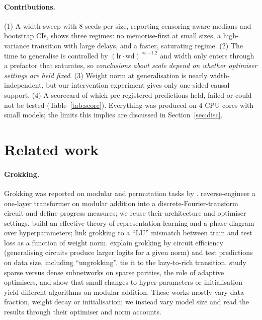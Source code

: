 \documentclass{article} %
\begin{document}
\paragraph{Contributions.} (1) A width sweep with 8 seeds per size, reporting censoring-aware medians and bootstrap CIs, shows three regimes: no memorise-first at small sizes, a high-variance transition with large delays, and a faster, saturating regime. (2) The time to generalise is controlled by $(\mathrm{lr}\cdot\mathrm{wd})^{\approx-1.2}$ and width only enters through a prefactor that saturates, so \emph{conclusions about scale depend on whether optimiser settings are held fixed}. (3) Weight norm at generalisation is nearly width-independent, but our intervention experiment gives only one-sided causal support. (4) A scorecard of which pre-registered predictions held, failed or could not be tested (Table~\ref{tab:score}). Everything was produced on 4 CPU cores with small models; the limits this implies are discussed in Section~\ref{sec:disc}.

\section{Related work}
\paragraph{Grokking.} Grokking was reported on modular and permutation tasks by \citet{power2022grokking}. \citet{nanda2023progress} reverse-engineer a one-layer transformer on modular addition into a discrete-Fourier-transform circuit and define progress measures; we reuse their architecture and optimiser settings. \citet{liu2022understanding} build an effective theory of representation learning and a phase diagram over hyperparameters; \citet{liu2023omnigrok} link grokking to a ``LU'' mismatch between train and test loss as a function of weight norm. \citet{varma2023explaining} explain grokking by circuit efficiency (generalising circuits produce larger logits for a given norm) and test predictions on data size, including ``ungrokking''. \citet{kumar2024grokking} tie it to the lazy-to-rich transition. \citet{merrill2023tale} study sparse versus dense subnetworks on sparse parities, \citet{thilak2022slingshot} the role of adaptive optimisers, and \citet{zhong2023clock} show that small changes to hyper-parameters or initialisation yield different algorithms on modular addition. These works mostly vary data fraction, weight decay or initialisation; we instead vary model size and read the results through their optimiser and norm accounts.
\end{document}
